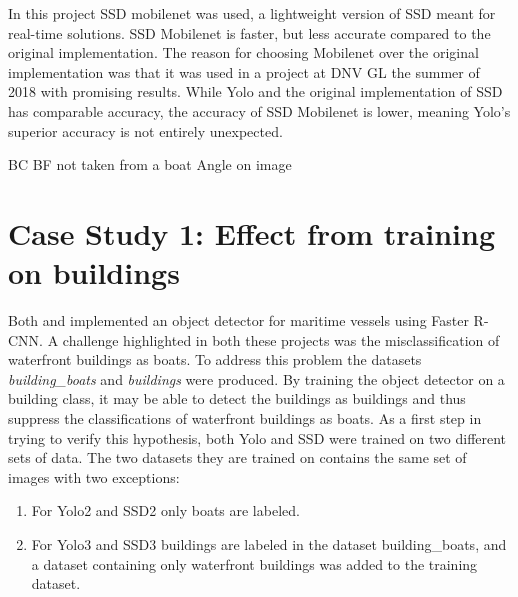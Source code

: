 \vspace{3mm}

In this project SSD mobilenet was used, a lightweight version of SSD meant for real-time solutions. SSD Mobilenet is faster, but less accurate compared to the original implementation. The reason for choosing Mobilenet over the original implementation was that it was used in a project at DNV GL the summer of 2018 with promising results. While Yolo and the original implementation of SSD has comparable accuracy, the accuracy of SSD Mobilenet is lower, meaning Yolo's superior accuracy is not entirely unexpected. 




\vspace{1cm}

BC BF not taken from a boat
Angle on image








\newpage

\section{Case Study 1: Effect from training on buildings}
\label{case_study:eff_build}

Both \citep{Tangstad2017} and \citep{Kamsvag2018} implemented an object detector for maritime vessels using Faster R-CNN. A challenge highlighted in both these projects was the misclassification of waterfront buildings as boats. To address this problem the datasets \textit{building\_boats} and \textit{buildings} were produced. By training the object detector on a building class, it may be able to detect the buildings as buildings and thus suppress the classifications of waterfront buildings as boats. As a first step in trying to verify this hypothesis, both Yolo and SSD were trained on two different sets of data. The two datasets they are trained on contains the same set of images with two exceptions:

\vspace{1mm}

\begin{enumerate}
    \item For Yolo2 and SSD2 only boats are labeled.
    \item For Yolo3 and SSD3 buildings are labeled in the dataset building\_boats, and a dataset containing only waterfront buildings was added to the training dataset.
\end{enumerate}

